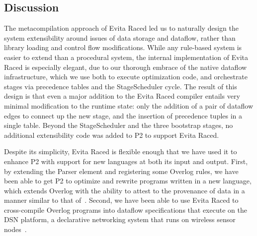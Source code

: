 \subsection{Discussion}
The metacompilation approach of Evita Raced led us to naturally design the system extensibility around issues of data storage and dataflow, rather than library loading and control flow modifications.  While any rule-based system is easier to extend than a procedural system, the internal implementation of Evita Raced is especially elegant, due to our thorough embrace of the native dataflow infrastructure, which we use both to execute optimization code, and orchestrate stages via precedence tables and the StageScheduler cycle.  The result of this design is that
even a major addition to the Evita Raced compiler entails very minimal
modification to the runtime state: only the addition of a pair of
dataflow edges to connect up the new stage, and the insertion of
precedence tuples in a single table.  Beyond the StageScheduler and the three bootstrap stages, no additional extensibility code was added to P2 to support Evita Raced.

Despite its simplicity, Evita Raced is flexible enough that we have used it to enhance P2 with support for new languages at both its input and output.  First, by extending the Parser element and registering some Overlog rules, we have been able to get P2  to optimize and rewrite programs written in a new language, which extends Overlog with the ability to attest to the provenance of data in a manner similar to that of~\cite{abadi-netdb07}.  Second, we have been able to use Evita Raced to cross-compile Overlog programs into dataflow specifications that execute on the DSN platform, a declarative networking system that runs on wireless sensor nodes~\cite{chu-sensys07}.


